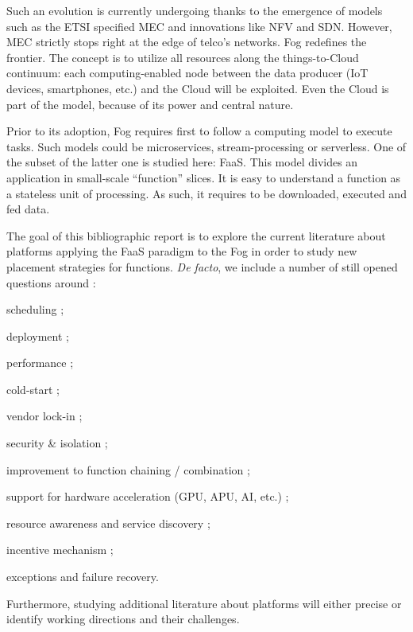 \documentclass[11pt]{sdm}
\begin{document}
Such an evolution is currently undergoing thanks to the emergence of models such as the \gls{ETSI} specified \gls{MEC} and innovations like \gls{NFV} and \gls{SDN}. However, \gls{MEC} strictly stops right at the edge of telco's networks. Fog redefines the frontier. The concept is to utilize all resources along the things-to-Cloud continuum: each computing-enabled node between the data producer (\gls{IoT} devices, smartphones, etc.) and the Cloud will be exploited. Even the Cloud is part of the model, because of its power and central nature.

Prior to its adoption, Fog requires first to follow a computing model to execute tasks. Such models could be microservices, stream-processing or serverless. One of the subset of the latter one is studied here: \gls{FaaS}. This model divides an application in small-scale ``function'' slices. It is easy to understand a function as a stateless unit of processing. As such, it requires to be downloaded, executed and fed data.

The goal of this bibliographic report is to explore the current literature about platforms applying the \gls{FaaS} paradigm to the Fog in order to study new placement strategies for functions. \textit{De facto}, we include a number of still opened questions around \cite{kjorveziroski_iot_2021,xie_when_2021}:
\begin{enumerate*}[(1)]
	\item scheduling ;
	\item deployment ;
	\item performance ;
	\item cold-start ;
	\item vendor lock-in ;
	\item security \& isolation ;
	\item improvement to function chaining / combination ;
	\item support for hardware acceleration (\gls{GPU}, \gls{APU}, \gls{AI}, etc.) ;
	\item resource awareness and service discovery ;
	\item incentive mechanism ;
	\item exceptions and failure recovery.
\end{enumerate*}
Furthermore, studying additional literature about platforms will either precise or identify working directions and their challenges.
\end{document}
